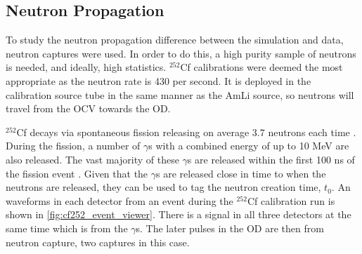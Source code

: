 \subsection{Neutron Propagation}
\par
To study the neutron propagation difference between the simulation and data, neutron captures were used.
In order to do this, a high purity sample of neutrons is needed, and ideally, high statistics.
${}^{252}$Cf calibrations were deemed the most appropriate as the neutron rate is 430 per second.
It is deployed in the calibration source tube in the same manner as the AmLi source, so neutrons will travel from the OCV towards the OD.
\par
${}^{252}$Cf decays via spontaneous fission releasing on average 3.7 neutrons each time \cite{californium252_ref}.
During the fission, a number of $\gamma$s with a combined energy of up to 10 MeV are also released.
The vast majority of these $\gamma$s are released within the first 100 ns of the fission event \cite{cf252_fission_ref,californium_spectra_ref}.
Given that the $\gamma$s are released close in time to when the neutrons are released, they can be used to tag the neutron creation time, $t_0$.
An waveforms in each detector from an event during the ${}^{252}$Cf calibration run is shown in \autoref{fig:cf252_event_viewer}.
There is a signal in all three detectors at the same time which is from the $\gamma$s.
The later pulses in the OD are then from neutron capture, two captures in this case.


